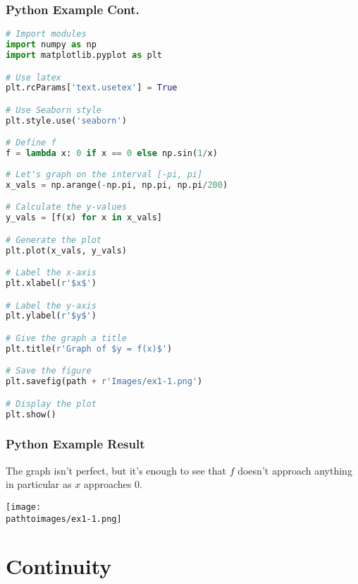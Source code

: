 \documentclass{beamer}
\newcommand{\pathtoimages}{/Users/charlesrambo/Desktop/Bootcamp24/Images}
\begin{document}

\begin{frame}[fragile]
\frametitle{Python Example Cont.}

\begin{lstlisting}[language=Python]
# Import modules 
import numpy as np
import matplotlib.pyplot as plt

# Use latex
plt.rcParams['text.usetex'] = True

# Use Seaborn style
plt.style.use('seaborn')

# Define f
f = lambda x: 0 if x == 0 else np.sin(1/x)   
        
# Let's graph on the interval [-pi, pi]
x_vals = np.arange(-np.pi, np.pi, np.pi/200)

# Calculate the y-values
y_vals = [f(x) for x in x_vals]

# Generate the plot
plt.plot(x_vals, y_vals)

# Label the x-axis
plt.xlabel(r'$x$')

# Label the y-axis
plt.ylabel(r'$y$')

# Give the graph a title
plt.title(r'Graph of $y = f(x)$')

# Save the figure
plt.savefig(path + r'Images/ex1-1.png')

# Display the plot
plt.show()

\end{lstlisting}
\end{frame}

\begin{frame}
\frametitle{Python Example Result}
The graph isn't perfect, but it's enough to see that $f$ doesn't approach anything in particular as $x$ approaches 0.

\begin{center}
\texttt{[image: \\pathtoimages/ex1-1.png]}
\end{center}
\end{frame}


\section{Continuity} 
\end{document}
